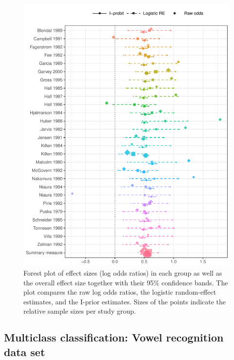 \documentclass[a4paper,showframe,11pt]{report}\usepackage[]{graphicx}\usepackage[]{color}
\newenvironment{knitrout}{}{} %
\begin{document}
\begin{knitrout}
\color{fgcolor}\begin{figure}[p]

{\centering \includegraphics[width=\linewidth]{figure/05-smoke_forest_plot-1} 

}

\caption[Forest plot of effect sizes (log odds ratios) in each group as well as the overall effect size together with their 95\% confidence bands]{Forest plot of effect sizes (log odds ratios) in each group as well as the overall effect size together with their 95\% confidence bands. The plot compares the raw log odds ratios, the logistic random-effect estimates, and the I-prior estimates. Sizes of the points indicate the relative sample sizes per study group.}\label{fig:smoke.forest.plot}
\end{figure}


\end{knitrout}

\subsection{Multiclass classification: Vowel recognition data set}
\end{document}

